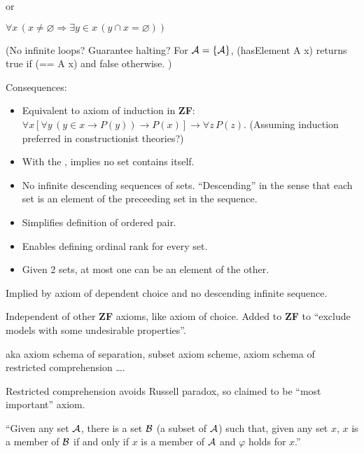 or
 
$\forall x\,(x\neq \varnothing \Rightarrow 
 \exists y\in x\,(y\cap x=\varnothing ))$
 
(No infinite loops? Guarantee halting? 
For $\mathcal{A} = \{\mathcal{A}\}$,
\textsf{(hasElement A x)} 
returns \textsf{true} if \textsf{(== A x)}
and \textsf{false} otherwise. )

Consequences:
\begin{itemize}
\item 
Equivalent to axiom of induction\cite{wiki:Epsilon-induction} 
in \textbf{ZF}:
$\forall x
[\forall y\,(y\in x\rightarrow P(y))\rightarrow P(x)]
\rightarrow \forall z\,P(z)$.
(Assuming induction preferred in constructionist theories?)

\item With the , 
implies no set contains itself.

\item No infinite descending sequences of sets.
``Descending'' in the sense that each set is an element of the
preceeding set in the sequence.

\item Simplifies definition of ordered pair.

\item Enables defining ordinal rank for every set.

\item Given 2 sets, at most one can be an element of the other.
\end{itemize}

Implied by axiom of dependent choice and 
no descending infinite sequence.

Independent of other \textbf{ZF} axioms, like axiom of choice.
Added to \textbf{ZF} to 
``exclude models with some undesirable properties''.

\label{sec:Axiom-schema-of-specification}

aka axiom schema of separation, subset axiom scheme,
axiom schema of restricted comprehension \ldots .

Restricted comprehension avoids Russell paradox,
so claimed to be ``most important'' axiom.

``Given any set $\mathcal{A}$, there is a set $\mathcal{B}$
 (a subset of $\mathcal{A}$) 
such that, given any set $x$, 
$x$ is a member of $\mathcal{B}$ if and only if $x$ 
is a member of $\mathcal{A}$ 
and $\varphi$ holds for $x$.''
\cite{wiki:Axiom_schema_of_specification}

